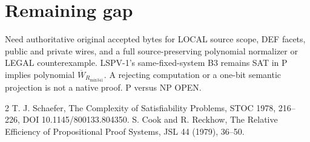 \documentclass[11pt]{article}
\begin{document}
\section*{Remaining gap}
\noindent Need authoritative original accepted bytes for LOCAL source scope, DEF facets, public and private wires, and a full source-preserving polynomial normalizer or LEGAL counterexample. LSPV-1's same-fixed-system B3 remains SAT in P implies polynomial $\overline W_{R_{\mathrm{mix341}}}$. A rejecting computation or a one-bit semantic projection is not a native proof. P versus NP OPEN.
\begin{thebibliography}{2}
 T. J. Schaefer, The Complexity of Satisfiability Problems, STOC 1978, 216--226, DOI 10.1145/800133.804350.
 S. Cook and R. Reckhow, The Relative Efficiency of Propositional Proof Systems, JSL 44 (1979), 36--50.
\end{thebibliography}
\end{document}
